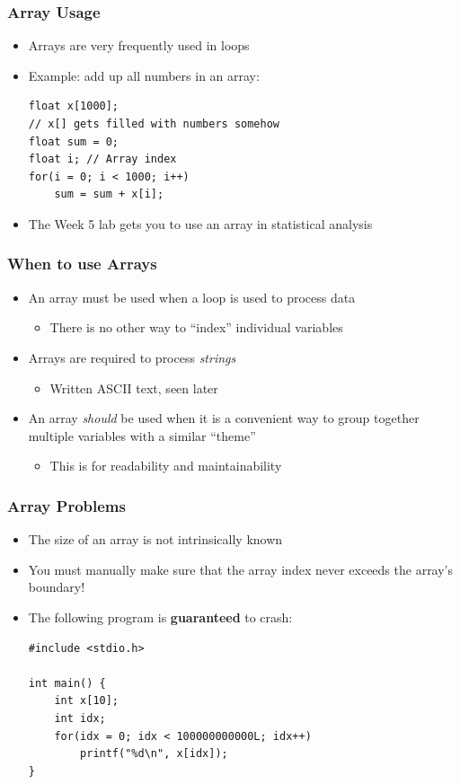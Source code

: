 \documentclass[14pt]{beamer}
\begin{document}
\begin{frame}[fragile]
\frametitle{Array Usage}
\begin{itemize}
\item Arrays are very frequently used in loops
\item Example: add up all numbers in an array:
\begin{lstlisting}[style=CStyle]
float x[1000];
// x[] gets filled with numbers somehow
float sum = 0;
float i; // Array index
for(i = 0; i < 1000; i++)
	sum = sum + x[i];
\end{lstlisting}
\pause
\item The Week 5 lab gets you to use an array in statistical analysis
\end{itemize}
\end{frame}

\begin{frame}
\frametitle{When to use Arrays}
\begin{itemize}
\item An array must be used when a loop is used to process data
	\begin{itemize}
		\item There is no other way to ``index'' individual variables
	\end{itemize}
\item Arrays are required to process \textit{strings}
	\begin{itemize}
		\item Written ASCII text, seen later
	\end{itemize}
\item An array \textit{should} be used when it is a convenient way to group together multiple variables with a similar ``theme''
	\begin{itemize}
		\item This is for readability and maintainability
	\end{itemize}
\end{itemize}
\end{frame}

\begin{frame}[fragile]
\frametitle{Array Problems}
\begin{itemize}
\item The size of an array is not intrinsically known
\item You must manually make sure that the array index never exceeds the array's boundary!
\item The following program is \textbf{guaranteed} to crash:
\begin{lstlisting}[style=CStyle]
#include <stdio.h>

int main() {
	int x[10];
	int idx;
	for(idx = 0; idx < 100000000000L; idx++)
		printf("%d\n", x[idx]);
}
\end{lstlisting}
\end{itemize}
\end{frame}
\end{document}
